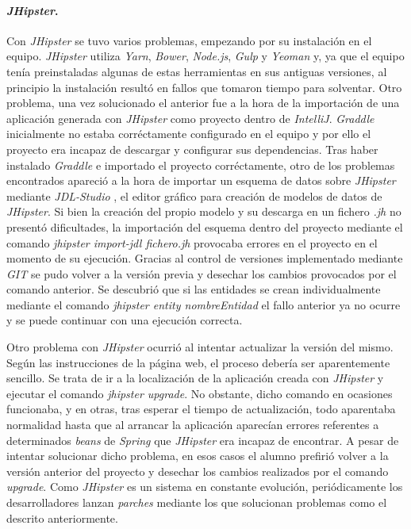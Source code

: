 \paragraph*{\textit{JHipster}.} Con \textit{JHipster} se tuvo varios problemas, empezando por su instalación en el equipo. \textit{JHipster} utiliza \textit{Yarn}, \textit{Bower}, \textit{Node.js}, \textit{Gulp} y \textit{Yeoman} y, ya que el equipo tenía preinstaladas algunas de estas herramientas en sus antiguas versiones, al principio la instalación resultó en fallos que tomaron tiempo para solventar. Otro problema, una vez solucionado el anterior fue a la hora de la importación de una aplicación generada con \textit{JHipster} como proyecto dentro de \textit{IntelliJ}. \textit{Graddle} inicialmente no estaba corréctamente configurado en el equipo y por ello el proyecto era incapaz de descargar y configurar sus dependencias. Tras haber instalado \textit{Graddle} e importado el proyecto corréctamente, otro de los problemas encontrados apareció a la hora de importar un esquema de datos sobre \textit{JHipster} mediante \textit{JDL-Studio} \cite{jdlstudio}, el editor gráfico para creación de modelos de datos de \textit{JHipster}. Si bien la creación del propio modelo y su descarga en un fichero  \textit{.jh} no presentó dificultades, la importación del esquema dentro del proyecto mediante el comando \textit{jhipster import-jdl fichero.jh} provocaba errores en el proyecto en el momento de su ejecución. Gracias al control de versiones implementado mediante \textit{GIT} \cite{git} se pudo volver a la versión previa y desechar los cambios provocados por el comando anterior. Se descubrió que si las entidades se crean individualmente mediante el comando \textit{jhipster entity nombreEntidad} el fallo anterior ya no ocurre y se puede continuar con una ejecución correcta. 
\par 
Otro problema con \textit{JHipster} ocurrió al intentar actualizar la versión del mismo. Según las instrucciones de la página web, el proceso debería ser aparentemente sencillo. Se trata de ir a la localización de la aplicación creada con \textit{JHipster} y ejecutar el comando \textit{jhipster upgrade}. No obstante, dicho comando en ocasiones funcionaba, y en otras, tras esperar el tiempo de actualización, todo aparentaba normalidad hasta que al arrancar la aplicación aparecían errores referentes a determinados \textit{beans} de \textit{Spring} que \textit{JHipster} era incapaz de encontrar. A pesar de intentar solucionar dicho problema, en esos casos el alumno prefirió volver a la versión anterior del proyecto y desechar los cambios realizados por el comando \textit{upgrade}. Como \textit{JHipster} es un sistema en constante evolución, periódicamente los desarrolladores lanzan \textit{parches} mediante los que solucionan problemas como el descrito anteriormente. 


